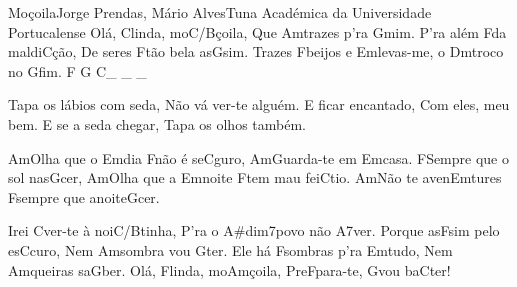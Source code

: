 \begin{musica}{Moçoila}{Jorge Prendas, Mário Alves}{Tuna Académica da Universidade Portucalense}
Olá, \ac{C}{lin}da, mo\ac{C/B}{çoi}la,
Que \ac{Am}{tra}zes p'ra \ac{G}{mim}.
P'ra além \ac{F}{da} maldi\ac{C}{ção},
De seres \ac{F}{tão} bela as\ac{G}{sim}.
Trazes \ac{F}{bei}jos e \ac{Em}{le}vas-me, o \ac{Dm}{tro}co no \ac{G}{fim}. \ac{F G C}{}_ _ _

Tapa os lábios com seda,
Não vá ver-te alguém.
E ficar encantado,
Com eles, meu bem.
E se a seda chegar,
Tapa os olhos também.

\ac{Am}{O}lha que o \ac{Em}{dia} \ac{F}{não} é se\ac{C}{gu}ro,
\ac{Am}{Guar}da-te em \ac{Em}{ca}sa.
\ac{F}{Sem}pre que o sol nas\ac{G}{cer},
\ac{Am}{O}lha que a \ac{Em}{noi}te \ac{F}{tem} mau fei\ac{C}{tio}.
\ac{Am}{Não} te aven\ac{Em}{tu}res \ac{F}{sem}pre que anoite\ac{G}{cer}.

Irei \ac{C}{ver}-te à noi\ac{C/B}{ti}nha,
P'ra o \ac{A#dim7}{po}vo não \ac{A7}{ver}.
Porque as\ac{F}{sim} pelo es\ac{C}{cu}ro,
Nem \ac{Am}{som}bra vou \ac{G}{ter}.
Ele há \ac{F}{som}bras p'ra \ac{Em}{tu}do,
Nem \ac{Am}{quei}ras sa\ac{G}{ber}.
Olá, \ac{F}{lin}da, mo\ac{Am}{çoi}la,
Pre\ac{F}{pa}ra-te, \ac{G}{vou} ba\ac{C}{ter}!

\end{musica}
